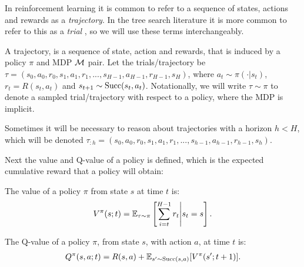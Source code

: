 


    In reinforcement learning it is common to refer to a sequence of states, actions and rewards as a \textit{trajectory}. In the tree search literature it is more common to refer to this as a \textit{trial} , so we will use these terms interchangeably.
    
    \begin{defn}
        \label{def:trajectory}
        A \textnormal{trajectory}, is a sequence of state, action and rewards, that is induced by a policy $\pi$ and MDP $\mathcal{M}$ pair. Let the trials/trajectory be $\tau = (s_0, a_0, r_0, s_1, a_1, r_1, ..., s_{H-1}, a_{H-1}, r_{H-1}, s_H)$, where $a_t \sim \pi(\cdot|s_t)$, $r_t=R(s_t,a_t)$ and $s_{t+1} \sim \textnormal{Succ}(s_t,a_t)$. Notationally, we will write $\tau\sim\pi$ to denote a sampled trial/trajectory with respect to a policy, where the MDP is implicit.

        Sometimes it will be necessary to reason about trajectories with a horizon $h<H$, which will be denoted $\tau_{:h} = (s_0, a_0, r_0, s_1, a_1, r_1, ..., s_{h-1}, a_{h-1}, r_{h-1}, s_h)$.
    \end{defn}

    Next the value and Q-value of a policy is defined, which is the expected cumulative reward that a policy will obtain:
    \begin{defn}
        \label{def:value}
        \label{def:q_value}
        The \textnormal{value} of a policy $\pi$ from state $s$ at time $t$ is:
        \begin{align}
            V^{\pi}(s;t) = \mathbb{E}_{\tau\sim\pi}\left[\sum_{i=t}^{H-1} r_t \Bigg| s_t=s \right].
        \end{align} 

        The \textnormal{Q-value} of a policy $\pi$, from state $s$, with action $a$, at time $t$ is:
        \begin{align}
            Q^{\pi}(s,a;t) = R(s,a) + \mathbb{E}_{s'\sim \textnormal{Succ}(s,a)} [V^{\pi}(s';t+1)].
        \end{align} 
    \end{defn}

